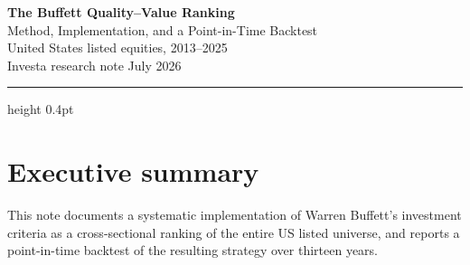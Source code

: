 \documentclass[11pt,a4paper]{article}
\begin{document}
\thispagestyle{empty}
\begin{center}
\vspace*{1.2cm}
{\sffamily\Huge\bfseries The Buffett Quality--Value Ranking}\\[0.5em]
{\sffamily\Large\color{ink2} Method, Implementation, and a Point-in-Time Backtest}\\[1.4em]
{\sffamily\large\color{muted} United States listed equities, 2013--2025}\\[0.8em]
{\sffamily\normalsize\color{muted} Investa research note \quad\textbullet{} July 2026}
\end{center}

\vspace{1.2cm}

\hrule height 0.4pt
\vspace{0.9em}

\section*{\sffamily Executive summary}

This note documents a systematic implementation of Warren Buffett's investment
criteria as a cross-sectional ranking of the entire US listed universe, and
reports a point-in-time backtest of the resulting strategy over thirteen years.
\end{document}
